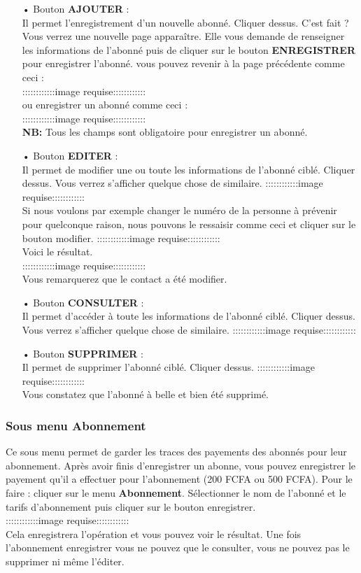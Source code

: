 \documentclass[12pt,a4paper]{article}
\begin{document}
\begin{itemize}
\item[•] Bouton \textbf{AJOUTER} : \\
Il permet l'enregistrement d'un nouvelle abonné. Cliquer dessus. C'est fait ? Vous verrez
une nouvelle page apparaître. Elle vous demande de renseigner les informations de l'abonné
puis de cliquer sur le bouton \textbf{ENREGISTRER} pour enregistrer l'abonné.
vous pouvez revenir à la page précédente comme ceci :\\
::::::::::::image requise::::::::::::\\
ou enregistrer un abonné comme ceci  :\\
::::::::::::image requise::::::::::::\\
\textbf{NB:} Tous les champs sont obligatoire pour enregistrer un abonné.
\item[•] Bouton \textbf{EDITER} : \\
Il permet de modifier une ou toute les informations de l'abonné ciblé. Cliquer dessus. Vous verrez s'afficher quelque chose de similaire.
::::::::::::image requise::::::::::::\\
Si nous voulons par exemple changer le numéro de la personne à prévenir pour quelconque 
raison, nous pouvons le ressaisir comme ceci et cliquer sur le bouton modifier.
::::::::::::image requise::::::::::::\\
Voici le résultat.\\
::::::::::::image requise::::::::::::\\
Vous remarquerez que le contact a été modifier.
\item[•] Bouton \textbf{CONSULTER} : \\
Il permet d'accéder à toute les informations de l'abonné ciblé. Cliquer dessus. Vous verrez
s'afficher quelque chose de similaire.
::::::::::::image requise::::::::::::\\
\item[•] Bouton \textbf{SUPPRIMER} : \\
Il permet de supprimer l'abonné ciblé. Cliquer dessus. 
::::::::::::image requise::::::::::::\\
Vous constatez que l'abonné à belle et bien été supprimé.
\end{itemize}
\subsubsection{Sous menu \textbf{Abonnement}}
Ce sous menu permet de garder les traces des payements des abonnés pour leur
abonnement. Après avoir finis d'enregistrer un abonne, vous pouvez enregistrer le 
payement qu'il a effectuer pour l'abonnement (200 FCFA ou 500 FCFA). Pour le faire :
cliquer sur le menu \textbf{Abonnement}. Sélectionner le nom de l'abonné et le tarifs
d'abonnement puis cliquer sur le bouton enregistrer.\\
::::::::::::image requise::::::::::::\\
Cela enregistrera l'opération et vous pouvez voir le résultat. Une fois l'abonnement
enregistrer vous ne pouvez que le consulter, vous ne pouvez pas le supprimer ni même
l'éditer.
\end{document}
